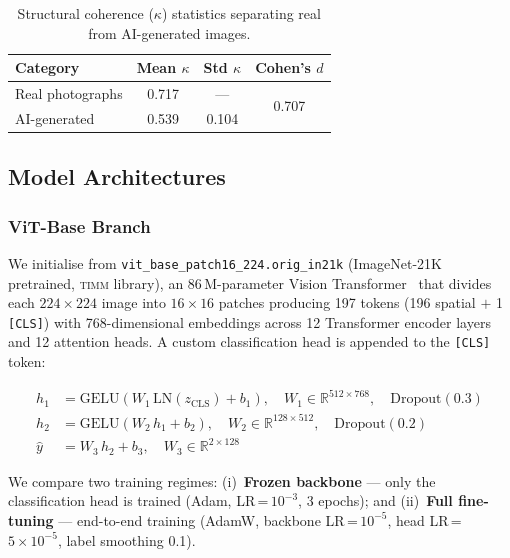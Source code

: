 \documentclass[12pt, a4paper]{article}
\begin{document}
\begin{table}[H]
\centering
\caption{Structural coherence ($\kappa$) statistics separating real from AI-generated images.}
\label{tab:coherence}
\begin{tabular}{lccc}
\toprule
\textbf{Category} & \textbf{Mean $\kappa$} & \textbf{Std $\kappa$} & \textbf{Cohen's $d$} \\
\midrule
Real photographs  & 0.717 & —     & \multirow{2}{*}{0.707} \\
AI-generated      & 0.539 & 0.104 & \\
\bottomrule
\end{tabular}
\end{table}

\subsection{Model Architectures}
\label{sec:models}

\subsubsection{ViT-Base Branch}

We initialise from \texttt{vit\_base\_patch16\_224.orig\_in21k}
(ImageNet-21K pretrained, \textsc{timm} library), an 86\,M-parameter Vision
Transformer~\cite{dosovitskiy2021vit} that divides each $224\times224$ image into
$16\times16$ patches producing 197 tokens (196 spatial $+$ 1 \texttt{[CLS]}) with
768-dimensional embeddings across 12 Transformer encoder layers and 12 attention
heads.  A custom classification head is appended to the \texttt{[CLS]} token:

\begin{align}
  h_1 &= \mathrm{GELU}\!\left(W_1\,\mathrm{LN}(z_{\mathrm{CLS}})+b_1\right),
         \quad W_1\!\in\!\mathbb{R}^{512\times768},
         \quad \mathrm{Dropout}(0.3) \label{eq:vit_h1} \\
  h_2 &= \mathrm{GELU}\!\left(W_2\,h_1+b_2\right),
         \quad W_2\!\in\!\mathbb{R}^{128\times512},
         \quad \mathrm{Dropout}(0.2) \label{eq:vit_h2} \\
  \hat{y} &= W_3\,h_2+b_3, \quad W_3\!\in\!\mathbb{R}^{2\times128}
         \label{eq:vit_out}
\end{align}

We compare two training regimes: (i)~\textbf{Frozen backbone} — only the
classification head is trained (Adam, LR\,=\,$10^{-3}$, 3 epochs); and
(ii)~\textbf{Full fine-tuning} — end-to-end training (AdamW, backbone
LR\,=\,$10^{-5}$, head LR\,=\,$5\!\times\!10^{-5}$, label smoothing 0.1).
\end{document}

